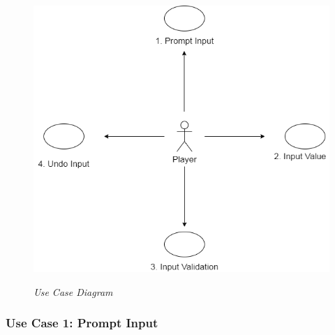 \documentclass[12pt]{article}
\begin{document}
\begin{figure}[htbp]
\centerline{\includegraphics[scale=.6]{Usecase Diagram.png}}
\centerline{\textit {Use Case Diagram}}
\end{figure}

\clearpage
\subsubsection{Use Case 1: Prompt Input} \label{uc:1}
\end{document}
